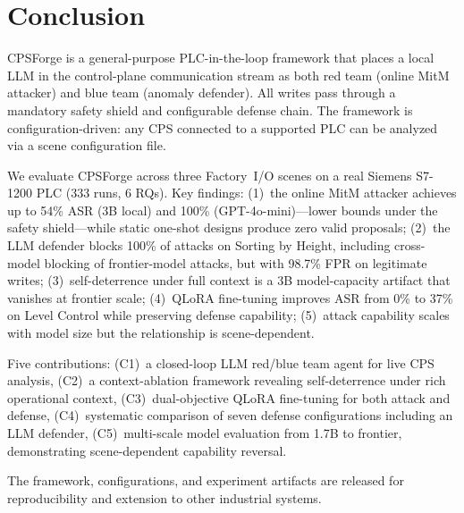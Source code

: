 \section{Conclusion}
\label{sec:conclusion}

CPSForge is a general-purpose PLC-in-the-loop framework that places a local LLM in the control-plane communication stream as both red team (online MitM attacker) and blue team (anomaly defender). All writes pass through a mandatory safety shield and configurable defense chain. The framework is configuration-driven: any CPS connected to a supported PLC can be analyzed via a scene configuration file.

We evaluate CPSForge across three Factory~I/O scenes on a real Siemens S7-1200 PLC (333 runs, 6 RQs). Key findings: (1)~the online MitM attacker achieves up to 54\% ASR (3B local) and 100\% (GPT-4o-mini)---lower bounds under the safety shield---while static one-shot designs produce zero valid proposals; (2)~the LLM defender blocks 100\% of attacks on Sorting by Height, including cross-model blocking of frontier-model attacks, but with 98.7\% FPR on legitimate writes; (3)~self-deterrence under full context is a 3B model-capacity artifact that vanishes at frontier scale; (4)~QLoRA fine-tuning improves ASR from 0\% to 37\% on Level Control while preserving defense capability; (5)~attack capability scales with model size but the relationship is scene-dependent.

Five contributions: (C1)~a closed-loop LLM red/blue team agent for live CPS analysis, (C2)~a context-ablation framework revealing self-deterrence under rich operational context, (C3)~dual-objective QLoRA fine-tuning for both attack and defense, (C4)~systematic comparison of seven defense configurations including an LLM defender, (C5)~multi-scale model evaluation from 1.7B to frontier, demonstrating scene-dependent capability reversal.

The framework, configurations, and experiment artifacts are released for reproducibility and extension to other industrial systems.
